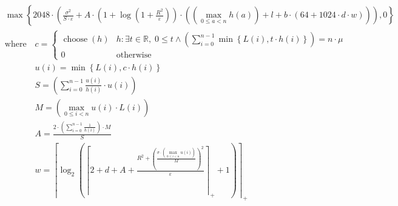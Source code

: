 \[\begin{aligned} &\max\left\{ 2048 \cdot \left(\frac{\sigma^{2}}{S \cdot \varepsilon} + A \cdot \left(1 + \log\left(1 + \frac{R^{2}}{\varepsilon}\right)\right) \cdot \left(\left(\max_{0\le a<n} h\left(a\right)\right) + l + b \cdot \left(64 + 1024 \cdot d \cdot w\right)\right)\right), 0 \right\} \\ &\text{where}\quad c = \begin{cases} \operatorname{choose}\left(h\right) & h : \exists t\in \mathbb{R},\;0 \leq t \land \left(\sum_{i=0}^{n-1} \min\left\{ L\left(i\right), t \cdot h\left(i\right) \right\}\right) = n \cdot \mu \\ 0 & \mathrm{otherwise} \end{cases} \\ &\phantom{\text{where}\quad} u\left(i\right) = \min\left\{ L\left(i\right), c \cdot h\left(i\right) \right\} \\ &\phantom{\text{where}\quad} S = \left(\sum_{i=0}^{n-1} \frac{u\left(i\right)}{h\left(i\right)} \cdot u\left(i\right)\right) \\ &\phantom{\text{where}\quad} M = \left(\max_{0\le i<n} u\left(i\right) \cdot L\left(i\right)\right) \\ &\phantom{\text{where}\quad} A = \frac{2 \cdot \left(\sum_{i=0}^{n-1} \frac{1}{h\left(i\right)}\right) \cdot M}{S} \\ &\phantom{\text{where}\quad} w = \left\lceil\log_{2}\left(\left\lceil 2 + d + A + \frac{R^{2} + \left(\frac{\sigma \cdot \left(\max_{0\le i<n} u\left(i\right)\right)}{M}\right)^{2}}{\varepsilon} \right\rceil_{+} + 1\right)\right\rceil_{+}\end{aligned}\]
